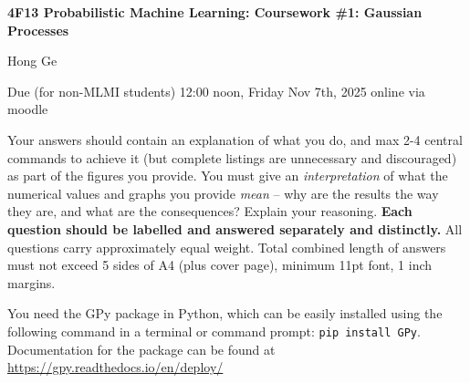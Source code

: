 \documentclass[12pt]{article}
\begin{document}
\centerline{\large\bf 4F13 Probabilistic Machine Learning: Coursework \#1: Gaussian Processes}

\vspace{0.3cm}

\centerline{Hong Ge} 

\vspace{0.2cm}

\centerline{Due (for non-MLMI students) 12:00 noon, Friday Nov 7th, 2025 online via moodle}

\vspace{2mm}

Your answers should contain an explanation of what you do, and max 2-4
central commands to achieve it (but complete listings are unnecessary
and discouraged) as part of the figures you provide. You must give an \emph{interpretation} of what the
numerical values and graphs you provide \emph{mean} -- why are the
results the way they are, and what are the consequences? Explain your
reasoning. {\bf Each question should be labelled and answered
  separately and distinctly.} All questions carry
approximately equal weight. 
Total combined length of answers must
not exceed 5 sides of A4 (plus cover page), minimum 11pt font, 1 inch
margins. 

You need the GPy package in Python, which can be easily installed using the following command in a terminal or command prompt: \texttt{pip install GPy}. Documentation for the package can be found at \url{https://gpy.readthedocs.io/en/deploy/}
\end{document}

